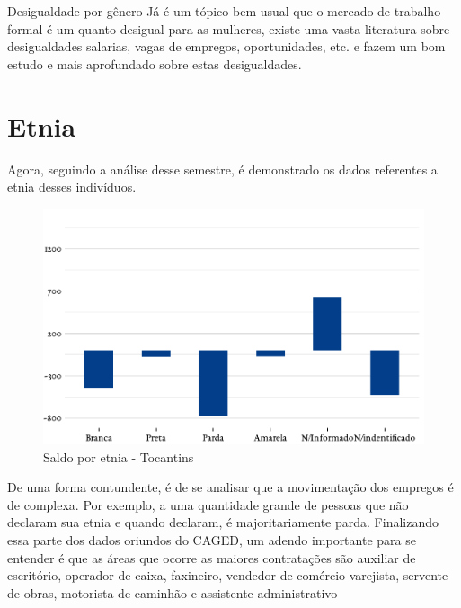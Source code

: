 \begin{smbox}[label={labelbox},nameref={Desigualdade por gênero}]{Desigualdade por gênero}
	Já é um tópico bem usual que o mercado de trabalho formal é um quanto desigual para as mulheres, existe uma vasta literatura sobre desigualdades salarias, vagas de empregos, oportunidades, etc. \cite{bibCotrim2020desigualdade} e \cite{bibHaussmann2018desigualdades} fazem um bom estudo e mais aprofundado sobre estas desigualdades.
\end{smbox}

\section{Etnia}
\par Agora, seguindo a análise desse semestre, é demonstrado os dados referentes a etnia desses indivíduos.

\begin{figure}[h]
	\caption{Saldo por etnia - Tocantins}
	\includegraphics[width=\linewidth]{fig/Saldo por etnia.pdf}
\end{figure}
\newpage
\par De uma forma contundente, é de se analisar que a movimentação dos empregos é de complexa. Por exemplo, a uma quantidade grande de pessoas que não declaram sua etnia e quando declaram, é majoritariamente parda. Finalizando essa parte dos dados oriundos do CAGED, um adendo importante para se entender é que as áreas que ocorre as maiores contratações são auxiliar de escritório, operador de caixa, faxineiro, vendedor de comércio varejista, servente de obras, motorista de caminhão e assistente administrativo

